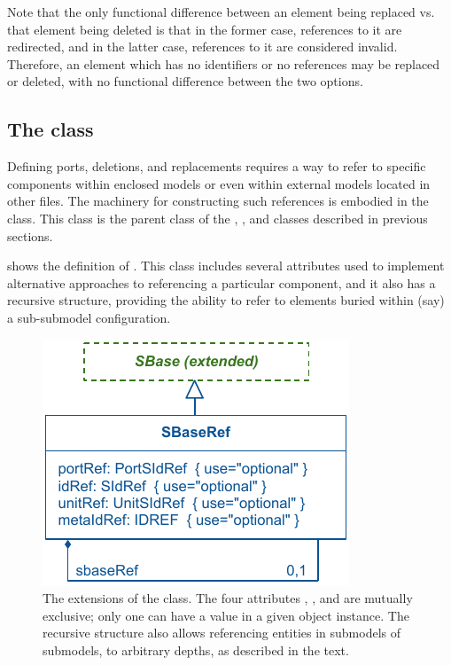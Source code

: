 Note that the only functional difference between an element being replaced
vs. that element being deleted is that in the former case, references
to it are redirected, and in the latter case, references to it are 
considered invalid.  Therefore, an element which has no identifiers or
no references may be replaced or deleted, with no functional difference
between the two options.

\subsection{The  class}
\label{sbaseref-class}

Defining ports, deletions, and replacements requires a way to refer to
specific components within enclosed models or even within external models
located in other files.  The machinery for constructing such references
is embodied in the \SBaseRef class.  This class is the parent class of
the \Port, \Deletion, \ReplacedElement and \ReplacedBy classes described
in previous sections.

 shows the definition of \SBaseRef.  This class
includes several attributes used to implement alternative approaches to
referencing a particular component, and it also has a recursive
structure, providing the ability to refer to elements buried within
(say) a sub-submodel configuration.

\begin{figure}[hbt]
  \includegraphics{figs/sbaseref-uml}
  \caption{The extensions of the \SBaseRef class.  The four attributes
    , ,  and 
    are mutually exclusive; only one can have a value in a given object
    instance.  The recursive structure also allows referencing entities
    in submodels of submodels, to arbitrary depths, as described in the
    text.}
  \label{sbaseref-uml}
\end{figure}


